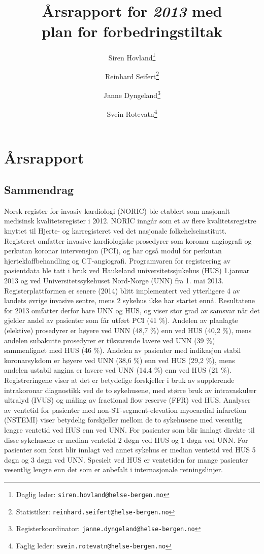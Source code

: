 \documentclass[norsk, a4paper]{report}
\title{\registernavn \\ \textbf{Årsrapport for \textit{2013} med \\
plan for forbedringstiltak}}
\author[$\dag$]{Siren Hovland\thanks{Daglig leder: \texttt{siren.hovland@helse-bergen.no}}}
\author[$\dag$]{Reinhard Seifert\thanks{Statistiker: \texttt{reinhard.seifert@helse-bergen.no}}}
\author[$\dag$]{Janne Dyngeland\thanks{Registerkoordinator: \texttt{janne.dyngeland@helse-bergen.no}}}
\author[$\dag$]{Svein Rotevatn\thanks{Faglig leder: \texttt{svein.rotevatn@helse-bergen.no}}}
\affil[$\dag$]{NORIC\\Norsk register for invasiv kardiologi \\
Haukeland universitetssjukehus \\
Hjerteavdelingen \\
Postboks 1400 \\
Jonas Lies vei 65 \\
5021 Bergen \\
epost \texttt{noric@helse-bergen.no} \\
Telefon 55 97 22 20}
\begin{document}
\maketitle


\tableofcontents


\part{Årsrapport}\label{par:rap}
\thispagestyle{empty}


\chapter{Sammendrag}
Norsk register for invasiv kardiologi (NORIC) ble etablert som nasjonalt medisinsk kvalitetsregister i 2012. NORIC inngår som et av flere kvalitetsregistre knyttet til Hjerte- og karregisteret ved det nasjonale folkehelseinstitutt. Registeret omfatter invasive kardiologiske prosedyrer som koronar angiografi og perkutan koronar intervensjon (PCI), og har også modul for perkutan hjerteklaffbehandling og CT-angiografi.
Programvaren for registrering av pasientdata ble tatt i bruk ved Haukeland universitetssjukehus (HUS) 1.januar 2013 og ved Universitetssykehuset Nord-Norge (UNN) fra 1. mai 2013. Registerplattformen er senere (2014) blitt implementert ved ytterligere 4 av landets øvrige invasive sentre, mens 2 sykehus ikke har startet ennå.
Resultatene for 2013 omfatter derfor bare UNN og HUS, og viser stor grad av samsvar når det gjelder andel av pasienter som får utført PCI (41 \%). Andelen av planlagte (elektive) prosedyrer er høyere ved UNN (48,7 \%) enn ved HUS (40,2 \%), mens andelen subakutte prosedyrer er tilsvarende lavere ved UNN (39 \%) sammenlignet med HUS (46 \%). Andelen av pasienter med indikasjon stabil koronarsykdom er høyere ved UNN (38,6 \%) enn ved HUS (29,2 \%), mens andelen ustabil angina er lavere ved UNN (14.4 \%) enn ved HUS (21 \%). Registreringene viser at det er betydelige forskjeller i bruk av supplerende intrakoronar diagnostikk ved de to sykehusene, med større bruk av intravaskulær ultralyd (IVUS) og måling av fractional flow reserve (FFR) ved HUS. 
Analyser av ventetid for pasienter med non-ST-segment-elevation myocardial infarction (NSTEMI) viser betydelig forskjeller mellom de to sykehusene med vesentlig lengre ventetid ved HUS enn ved UNN. For pasienter som blir innlagt direkte til disse sykehusene er median ventetid 2 døgn ved HUS og 1 døgn ved UNN. For pasienter som først blir innlagt ved annet sykehus er median ventetid ved HUS 5 døgn og 3 døgn ved UNN. Spesielt ved HUS er ventetiden for mange pasienter vesentlig lengre enn det som er anbefalt i internasjonale retningslinjer.
\end{document}
